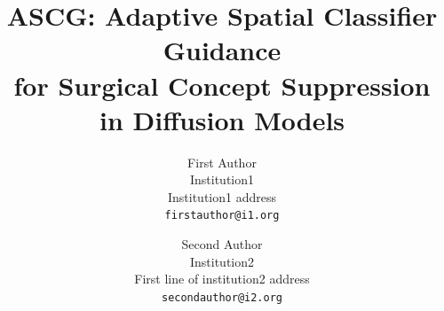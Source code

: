 \documentclass[10pt,twocolumn,letterpaper]{article}
\title{ASCG: Adaptive Spatial Classifier Guidance \\ for Surgical Concept Suppression in Diffusion Models}
\author{First Author\\
Institution1\\
Institution1 address\\
{\tt\small firstauthor@i1.org}
\and
Second Author\\
Institution2\\
First line of institution2 address\\
{\tt\small secondauthor@i2.org}
}
\begin{document}
\maketitle
    



{
    \small
    
    
}

\clearpage
\appendix
\renewcommand{\thesection}{\Alph{section}}

\end{document}
